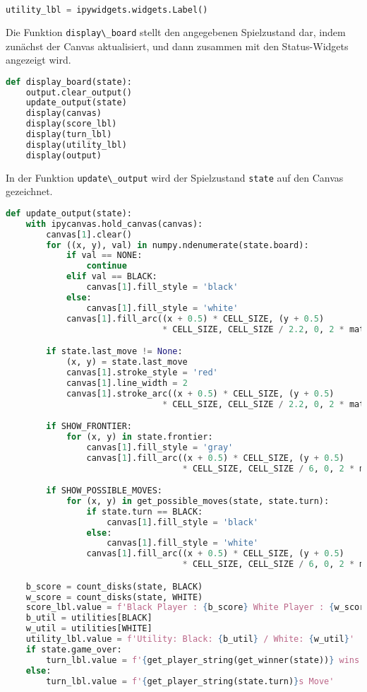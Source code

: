 \begin{lstlisting}[language=Python]
utility_lbl = ipywidgets.widgets.Label()
\end{lstlisting}

Die Funktion \passthrough{\lstinline!display\_board!} stellt den
angegebenen Spielzustand dar, indem zunächst der Canvas aktualisiert,
und dann zusammen mit den Status-Widgets angezeigt wird.

\begin{lstlisting}[language=Python]
def display_board(state):
    output.clear_output()
    update_output(state)
    display(canvas)
    display(score_lbl)
    display(turn_lbl)
    display(utility_lbl)
    display(output)
\end{lstlisting}

In der Funktion \passthrough{\lstinline!update\_output!} wird der
Spielzustand \passthrough{\lstinline!state!} auf den Canvas gezeichnet.

\begin{lstlisting}[language=Python]
def update_output(state):
    with ipycanvas.hold_canvas(canvas):
        canvas[1].clear()
        for ((x, y), val) in numpy.ndenumerate(state.board):
            if val == NONE:
                continue
            elif val == BLACK:
                canvas[1].fill_style = 'black'
            else:
                canvas[1].fill_style = 'white'
            canvas[1].fill_arc((x + 0.5) * CELL_SIZE, (y + 0.5)
                               * CELL_SIZE, CELL_SIZE / 2.2, 0, 2 * math.pi)

        if state.last_move != None:
            (x, y) = state.last_move
            canvas[1].stroke_style = 'red'
            canvas[1].line_width = 2
            canvas[1].stroke_arc((x + 0.5) * CELL_SIZE, (y + 0.5)
                               * CELL_SIZE, CELL_SIZE / 2.2, 0, 2 * math.pi)

        if SHOW_FRONTIER:
            for (x, y) in state.frontier:
                canvas[1].fill_style = 'gray'
                canvas[1].fill_arc((x + 0.5) * CELL_SIZE, (y + 0.5)
                                   * CELL_SIZE, CELL_SIZE / 6, 0, 2 * math.pi)

        if SHOW_POSSIBLE_MOVES:
            for (x, y) in get_possible_moves(state, state.turn):
                if state.turn == BLACK:
                    canvas[1].fill_style = 'black'
                else:
                    canvas[1].fill_style = 'white'
                canvas[1].fill_arc((x + 0.5) * CELL_SIZE, (y + 0.5)
                                   * CELL_SIZE, CELL_SIZE / 6, 0, 2 * math.pi)

    b_score = count_disks(state, BLACK)
    w_score = count_disks(state, WHITE)
    score_lbl.value = f'Black Player : {b_score} White Player : {w_score}'
    b_util = utilities[BLACK]
    w_util = utilities[WHITE]
    utility_lbl.value = f'Utility: Black: {b_util} / White: {w_util}'
    if state.game_over:
        turn_lbl.value = f'{get_player_string(get_winner(state))} wins'
    else:
        turn_lbl.value = f'{get_player_string(state.turn)}s Move'
\end{lstlisting}


